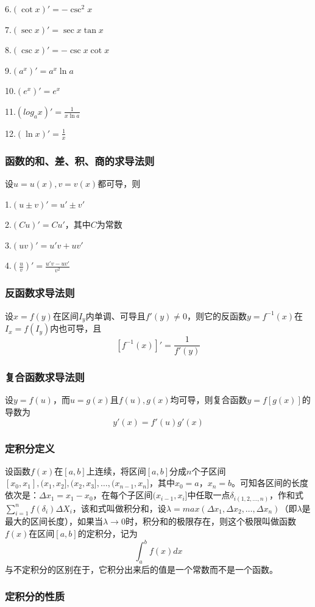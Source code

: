 \documentclass[UTF-8]{ctexart}
\begin{document}
	6.$(\cot x)'=-\csc^2 x$  
	
	7.$(\sec x)'=\sec x \tan x$  
	
	8.$(\csc x)'=-\csc x\cot x$  
	
	9.$(a^x)'=a^x \ln a$  
	
	10.$(e^x)'=e^x$  
	
	11.$(log _ a x)'=\frac{1}{x \ln a}$  
	
	12.$(\ln x)'=\frac{1}{x}$  
	\subsubsection{函数的和、差、积、商的求导法则}
	
	设$u=u(x),v=v(x)$都可导，则  
	
	1.$(u \pm v)'=u' \pm v'$  
	
	2.$(Cu)'=Cu'$，其中$C$为常数  
	
	3.$(uv)'=u'v+uv'$  
	
	4.$(\frac{u}{v})'=\frac{u'v-uv'}{v^2}$
	
	\subsubsection{反函数求导法则}
	设$x=f(y)$在区间$I _ y$内单调、可导且$f'(y)\ne 0$，则它的反函数$y=f^{-1}(x)$在$I _ x=f(I _ y)$内也可导，且  
	$$[f^{-1}(x)]'=\frac{1}{f'(y)}$$
	
	\subsubsection{复合函数求导法则}
	设$y=f(u)$，而$u=g(x)$且$f(u),g(x)$均可导，则复合函数$y=f[g(x)]$的导数为  
	$$y'(x)=f'(u) g'(x)$$
	\subsubsection{定积分定义}
	设函数$f(x)$在$[a,b]$上连续，将区间$[a,b]$分成$n$个子区间$[x _ 0,x _ 1], (x _ 1,x _ 2], (x _ 2,x _ 3], …, (x _ {n-1},x _ n]$，其中$x _ 0=a，x _ n=b$。可知各区间的长度依次是：$\Delta x _ 1=x _ 1-x _ 0$，在每个子区间$(x _ {i-1},x _ i]$中任取一点$\delta  _ {i(1,2,...,n)}$，作和式$\sum _ {i=1}^{n}f(\delta _ i) \Delta X _ i$，该和式叫做积分和，设$\lambda=max(\Delta x _ 1, \Delta x _ 2, …, \Delta x _ n)$（即$\lambda$是最大的区间长度），如果当$\lambda→0$时，积分和的极限存在，则这个极限叫做函数$f(x)$在区间$[a,b]$的定积分，记为  
	$$\int _ {a}^{b} f(x)dx$$  
	与不定积分的区别在于，它积分出来后的值是一个常数而不是一个函数。
	\subsubsection{定积分的性质}
\end{document}
